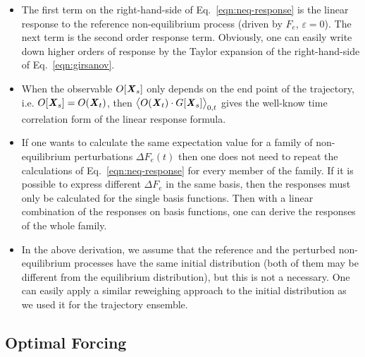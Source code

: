 \documentclass[aip,jcp,a4paper,reprint,onecolumn]{revtex4-1}
\newcommand{\vect}[1]{\textbf{\textit{#1}}}
\newcommand{\eps}{\varepsilon}
\begin{document}
\begin{itemize}
\item The first term on the right-hand-side of Eq.~\eqref{eqn:neq-response} is the linear
  response to the reference non-equilibrium process (driven by $F_e$, $\eps=0$). The next term is the second order response term. Obviously, one can easily write down higher orders of response by the Taylor expansion of the right-hand-side of Eq.~\eqref{eqn:girsanov}.
\item When the observable $O[\vect X_s]$ only depends on the end point of the trajectory, i.e.
  $O[\vect X_s] = O(\vect X_t)$, then $\big\langle O(\vect X_t)\cdot G[\vect X_s]\big\rangle_{0,t}$
  gives the well-know time correlation form of the linear response formula.
\item If one wants to calculate the same expectation value for a family of non-equilibrium perturbations $\Delta F_e(t)$ then 
one does not need to repeat the calculations of Eq.~\eqref{eqn:neq-response} for every member of the family. 
  If it is possible to
  express different $\Delta F_e$ in the same basis, then the responses must only be
  calculated for the single basis functions. Then with a linear combination of the responses on basis functions, one can derive
  the responses of the whole family. 
\item In the above derivation, we assume that the reference and the perturbed non-equilibrium processes
  have the same initial distribution (both of them may be different from the equilibrium distribution),
  but this is not a necessary. One can easily
  apply a similar reweighing approach to the initial distribution as we used it for the trajectory ensemble.
\end{itemize}





\subsection{Optimal Forcing}
\end{document}
